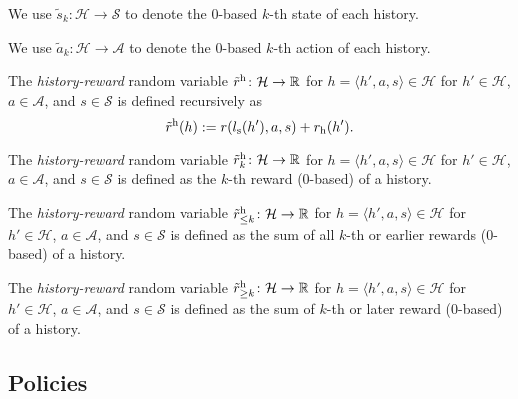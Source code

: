 \begin{definition}
  We use $\tilde{s}_k\colon \mathcal{H} \to \mathcal{S}$ to denote the 0-based $k$-th state of each history.
  \leanok
\end{definition}

\begin{definition}
  We use $\tilde{a}_k\colon \mathcal{H} \to \mathcal{A}$ to denote the 0-based $k$-th action of each history.
  \leanok
\end{definition}

\begin{definition} \label{def:reward}
The \emph{history-reward} random variable $\tilde{r}^{\mathrm{h}}\colon \mathcal{H} \to \mathbb{R}$ for $h = \langle h', a, s \rangle \in  \mathcal{H}$ for $h'\in \mathcal{H}$, $a\in \mathcal{A}$, and $s\in \mathcal{S}$ is defined recursively as
\[
\tilde{r}^{\mathrm{h}}(h) := r(l_{\mathrm{s}}(h'), a, s) + r_{\mathrm{h}}(h').
\]
 \leanok
\end{definition}

\begin{definition}\label{reward_at}
The \emph{history-reward} random variable $\tilde{r}^{\mathrm{h}}_k \colon \mathcal{H} \to \mathbb{R}$ for $h = \langle h', a, s \rangle \in  \mathcal{H}$ for $h'\in \mathcal{H}$, $a\in \mathcal{A}$, and $s\in \mathcal{S}$ is defined as the $k$-th reward (0-based) of a history.
 \leanok
\end{definition}

\begin{definition}\label{reward_to}
The \emph{history-reward} random variable $\tilde{r}^{\mathrm{h}}_{\le k} \colon \mathcal{H} \to \mathbb{R}$ for $h = \langle h', a, s \rangle \in  \mathcal{H}$ for $h'\in \mathcal{H}$, $a\in \mathcal{A}$, and $s\in \mathcal{S}$ is defined as the sum of all $k$-th or earlier rewards (0-based) of a history.
 \leanok
\end{definition}

\begin{definition}\label{reward_from}
The \emph{history-reward} random variable $\tilde{r}^{\mathrm{h}}_{\ge k}\colon \mathcal{H} \to \mathbb{R}$ for $h = \langle h', a, s \rangle \in  \mathcal{H}$ for $h'\in \mathcal{H}$, $a\in \mathcal{A}$, and $s\in \mathcal{S}$ is defined as the sum of $k$-th or later reward (0-based) of a history.
 \leanok
\end{definition}

\subsection{Policies}

